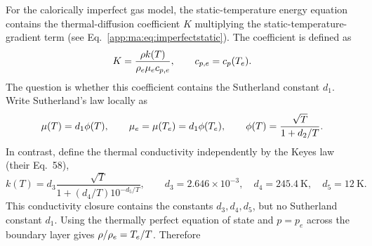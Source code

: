 For the calorically imperfect gas model, the static-temperature energy equation contains the thermal-diffusion coefficient \(K\) multiplying the static-temperature-gradient term (see Eq.~\eqref{app:ma:eq:imperfectstatic}). The coefficient is defined as
\begin{equation}
  K=\frac{\rho k(T)}{\rho_e\mu_e c_{p,e}},
  \qquad
  c_{p,e}=c_p(T_e).
  \label{app:ma:eq:K_appendix_def}
\end{equation}
The question is whether this coefficient contains the Sutherland constant \(d_1\). Write Sutherland's law locally as
\begin{equation}
  \mu(T)=d_1\phi(T),
  \qquad
  \mu_e=\mu(T_e)=d_1\phi(T_e),
  \qquad
  \phi(T)=\frac{\sqrt{T}}{1+d_2/T}.
\end{equation}
In contrast, \maAppName{} define the thermal conductivity independently by the Keyes law (their Eq.~58),
\begin{equation}
  k(T)
  =
  d_3
  \frac{\sqrt{T}}
       {1+\left(d_4/T\right)10^{-d_5/T}},
  \qquad
  d_3=2.646\times10^{-3},\quad
  d_4=245.4~\mathrm{K},\quad
  d_5=12~\mathrm{K}.
\end{equation}
This conductivity closure contains the constants \(d_3,d_4,d_5\), but no Sutherland constant \(d_1\).
Using the thermally perfect equation of state and \(p=p_e\) across the boundary layer gives \(\rho/\rho_e=T_e/T\). Therefore


\clearpage
\endgroup
